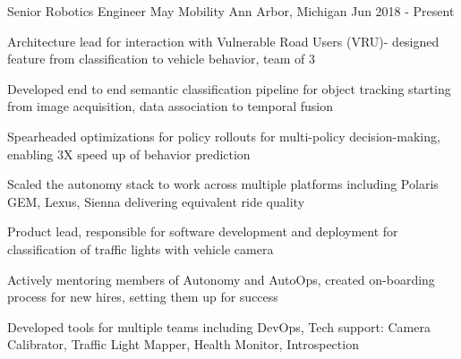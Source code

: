 \vspace{-2mm}

\begin{cventries}

  \cventry
    {Senior Robotics Engineer} %
    {May Mobility} %
    {Ann Arbor, Michigan} %
    {Jun 2018 - Present} %
    {
      \begin{cvitems} %
        \item {Architecture lead for interaction with Vulnerable Road Users (VRU)- designed feature from classification to vehicle behavior, team of 3}
        \item {Developed end to end semantic classification pipeline for object tracking starting from image acquisition, data association to temporal fusion}
		\item {Spearheaded optimizations for policy rollouts for multi-policy decision-making, enabling 3X speed up of behavior prediction }
		\item {Scaled the autonomy stack to work across multiple platforms including Polaris GEM, Lexus, Sienna delivering equivalent ride quality}
        \item {Product lead, responsible for software development and deployment for classification of traffic lights with vehicle camera}
        \item {Actively mentoring members of Autonomy and AutoOps, created on-boarding process for new hires, setting them up for success}
        \item {Developed tools for multiple teams including DevOps, Tech support: Camera Calibrator, Traffic Light Mapper, Health Monitor, Introspection}
      \end{cvitems}
    }


\end{cventries}
